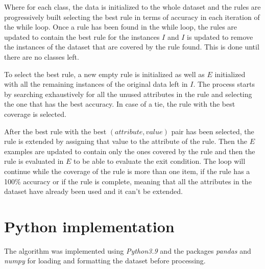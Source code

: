 Where for each class, the data is initialized to the whole dataset and the rules are progressively built selecting the best rule in terms of accuracy in each iteration of the while loop. Once a rule has been found in the while loop, the rules are updated to contain the best rule for the instances $I$ and $I$ is updated to remove the instances of the dataset that are covered by the rule found. This is done until there are no classes left.\;

To select the best rule, a new empty rule is initialized as well as $E$ initialized with all the remaining instances of the original data left in $I$. The process starts by searching exhaustively for all the unused attributes in the rule and selecting the one that has the best accuracy. In case of a tie, the rule with the best coverage is selected. 

After the best rule with the best $(attribute, value)$ pair has been selected, the rule is extended by assigning that value to the attribute of the rule. Then the $E$ examples are updated to contain only the ones covered by the rule and then the rule is evaluated in $E$ to be able to evaluate the exit condition. The loop will continue while the coverage of the rule is more than one item, if the rule has a 100\% accuracy or if the rule is complete, meaning that all the attributes in the dataset have already been used and it can't be extended.\;

\section{Python implementation}

The algorithm was implemented using \emph{Python3.9} and the packages \emph{pandas} and \emph{numpy} for loading and formatting the dataset before processing.\;

